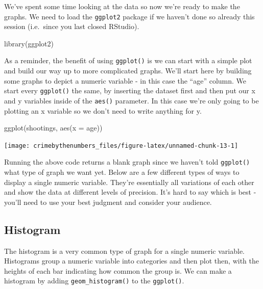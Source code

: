 \documentclass[
  12pt,
]{book}
\newenvironment{Shaded}{\begin{snugshade}}{\end{snugshade}}
\newcommand{\AttributeTok}[1]{\textcolor[rgb]{0.61,0.61,0.61}{#1}}
\newcommand{\FunctionTok}[1]{\textcolor[rgb]{0,0,0}{#1}}
\newcommand{\NormalTok}[1]{#1}
\begin{document}
We've spent some time looking at the data so now we're ready to make the graphs. We need to load the \texttt{ggplot2} package if we haven't done so already this session (i.e.~since you last closed RStudio).

\begin{Shaded}
\begin{Highlighting}[]
\FunctionTok{library}\NormalTok{(ggplot2)}
\end{Highlighting}
\end{Shaded}

As a reminder, the benefit of using \texttt{ggplot()} is we can start with a simple plot and build our way up to more complicated graphs. We'll start here by building some graphs to depict a numeric variable - in this case the ``age'' column. We start every \texttt{ggplot()} the same, by inserting the dataset first and then put our x and y variables inside of the \texttt{aes()} parameter. In this case we're only going to be plotting an x variable so we don't need to write anything for y.

\begin{Shaded}
\begin{Highlighting}[]
\FunctionTok{ggplot}\NormalTok{(shootings, }\FunctionTok{aes}\NormalTok{(}\AttributeTok{x =}\NormalTok{ age))}
\end{Highlighting}
\end{Shaded}

\begin{center}\texttt{[image: crimebythenumbers\_files/figure-latex/unnamed-chunk-13-1]} \end{center}

Running the above code returns a blank graph since we haven't told \texttt{ggplot()} what type of graph we want yet. Below are a few different types of ways to display a single numeric variable. They're essentially all variations of each other and show the data at different levels of precision. It's hard to say which is best - you'll need to use your best judgment and consider your audience.

\hypertarget{histogram}{%
\subsection{Histogram}\label{histogram}}

The histogram is a very common type of graph for a single numeric variable. Histograms group a numeric variable into categories and then plot then, with the heights of each bar indicating how common the group is. We can make a histogram by adding \texttt{geom\_histogram()} to the \texttt{ggplot()}.
\end{document}

